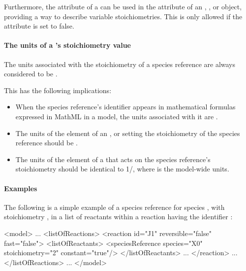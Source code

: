 Furthermore, the  attribute of a \SpeciesReference can be
used in the  attribute of an \InitialAssignment, \RateRule,
\AssignmentRule or \EventAssignment object, providing a way to describe
variable stoichiometries. This is only allowed if the 
 attribute is set to false. 


\paragraph{The units of a {\SpeciesReference}'s stoichiometry value}

The units associated with the stoichiometry of a species reference 
are always considered to be .

This has the following implications:
\begin{itemize}

\item When the species reference's identifier appears in mathematical
  formulas expressed in MathML in a model, the units associated
  with it are .

\item The units of the  element of an \AssignmentRule,
  \InitialAssignment or \EventAssignment setting the stoichiometry of the
  species reference should be .

\item The units of the  element of a \RateRule that
  acts on the species reference's stoichiometry should be 
  identical to 1/, where  is the model-wide 
   units.

\end{itemize}



\paragraph{Examples}

The following is a simple example of a species reference for
species , with stoichiometry , in a list of
reactants within a reaction having the identifier :

\begin{example}
<model>
    ...
    <listOfReactions>
        <reaction id="J1" reversible="false" fast="false">
            <listOfReactants>
                <speciesReference species="X0" stoichiometry="2" constant="true"/>
            </listOfReactants>
            ...
        </reaction>
        ...
    </listOfReactions>
    ...
</model>
\end{example}

